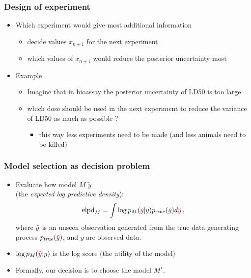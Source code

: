 \documentclass[10pt]{beamer}
\begin{document}
\begin{frame}

\frametitle{Design of experiment}

  \begin{itemize}
  \item Which experiment would give most additional information
    \begin{itemize}
    \item decide values $x_{n+1}$ for the next experiment
    \item which values of $x_{n+1}$ would reduce the posterior uncertainty most
    \end{itemize}
  \item Example
    \begin{itemize}
    \item Imagine that in bioassay the posterior uncertainty of LD50 is too large
    \item which dose should be used in the next experiment to reduce
      the variance of LD50 as much as possible ?
      \begin{itemize}
        \item this way less experiments need to be made (and less animals need to be killed)
      \end{itemize}
    \end{itemize}
  \end{itemize}
\end{frame}


\begin{frame}

\frametitle{Model selection as decision problem}

\begin{itemize}
\item Evaluate how model $M$  $\tilde{y}$\\(the \emph{expected log predictive density}):
\[
\text{elpd}_M= \int \log p_M({\color{uured}\tilde{y}}|y) p_\text{true}({\color{uured}\tilde{y}}) d{\color{uured}\tilde{y}}\,,
\]
where ${\color{uured}\tilde{y}}$ is an unseen observation generated from the true data generating process $p_\text{true}({\color{uured}\tilde{y}})$, and $y$ are observed data.
\item $\log p_M({\color{uured}\tilde{y}}|y)$ is the log score (the utility of the model)
\pause
\item Formally, our decision is to choose the model $M^\star$.
\end{itemize}

\end{frame}
\end{document}
